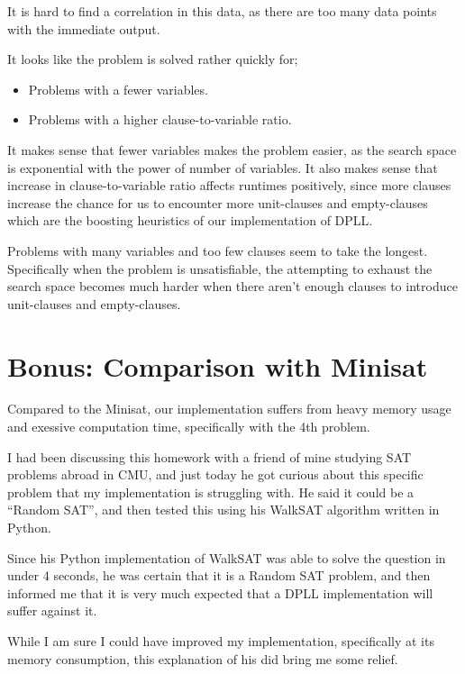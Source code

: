 \documentclass{article}
\begin{document}
It is hard to find a correlation in this data,
as there are too many data points with the immediate
output.

It looks like the problem is solved rather quickly for;
\begin{itemize}
    \item Problems with a fewer variables.
    \item Problems with a higher clause-to-variable ratio.
\end{itemize}

It makes sense that fewer variables makes the problem
easier, as the search space is exponential with the
power of number of variables. It also makes sense
that increase in clause-to-variable ratio affects
runtimes positively, since more clauses increase the chance
for us to encounter more unit-clauses and empty-clauses
which are the boosting heuristics of our implementation
of DPLL.

Problems with many variables and too few clauses seem
to take the longest. Specifically when the problem
is unsatisfiable, the attempting to exhaust the search
space becomes much harder when there aren't enough
clauses to introduce unit-clauses and empty-clauses.

\section{Bonus: Comparison with Minisat}

Compared to the Minisat, our implementation suffers from
heavy memory usage and exessive computation time,
specifically with the 4th problem.

I had been discussing this homework with a friend of mine
studying SAT problems abroad in CMU, and just today
he got curious about this specific problem that my
implementation is struggling with. He said it could
be a ``Random SAT'', and then tested this using
his WalkSAT algorithm written in Python.

Since his Python implementation of WalkSAT was able to
solve the question in under 4 seconds, he was certain
that it is a Random SAT problem, and then informed me
that it is very much expected that a DPLL implementation
will suffer against it.

While I am sure I could have improved my implementation,
specifically at its memory consumption, this explanation
of his did bring me some relief.
\end{document}
